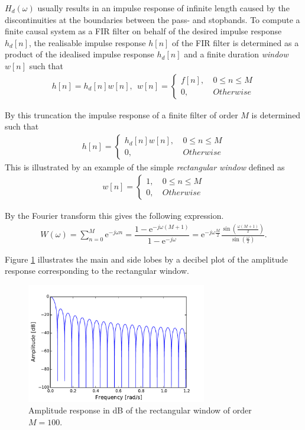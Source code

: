 $H_d(\omega)$ usually results in an impulse response of infinite length caused by the discontinuities at the boundaries between the pass- and stopbands. To compute a finite causal system as a FIR filter on behalf of the desired impulse response $h_d[n]$, the realisable impulse response $h[n]$ of the FIR filter is determined as a product of the idealised impulse response $h_d[n]$ and a finite duration \textit{window} $w[n]$ such that
\begin{align}
h[n]=h_d[n]w[n], \ \ w[n] =
\left\{ \begin{matrix}
f[n], &\ 0 \leq n \leq M \\
0, &\ Otherwise
\end{matrix}\right.
\end{align}

By this truncation the impulse response of a finite filter of order $M$ is determined such that
\begin{align}
h[n]= 
\left\{ \begin{matrix}
h_d[n]w[n], &\ 0 \leq n \leq M \\
0, &\ Otherwise
\end{matrix}\right.
\end{align}
This is illustrated by an example of the simple \textit{rectangular window} defined as 
\begin{align}
w[n] =
\left\{ \begin{matrix}
1, &\ 0 \leq n \leq M \\
0, &\ Otherwise
\end{matrix}\right.
\end{align}

By the Fourier transform this gives the following expression.
\begin{align}
W\left(\omega\right) = \sum_{n=0}^{M} \text{e}^{-j\omega n} = \dfrac{1 - \text{e}^{-j\omega(M+1)}}{1 - \text{e}^{-j\omega}} = \text{e}^{-j\omega \frac{M}{2}} \frac{ \sin \left( \frac{\omega \left( M+1 \right)}{2} \right)}{\sin \left( \frac{\omega}{2} \right)}.
\end{align}

Figure \ref{fig:rect_db} illustrates the main and side lobes by a decibel plot of the amplitude response corresponding to the rectangular window.

\begin{figure}[H]
\centering
\includegraphics[width=0.7\textwidth]{figures/dbplots/rect.pdf}
\caption{Amplitude response in dB of the rectangular window of order $M=100$.}
\label{fig:rect_db}
\end{figure}

